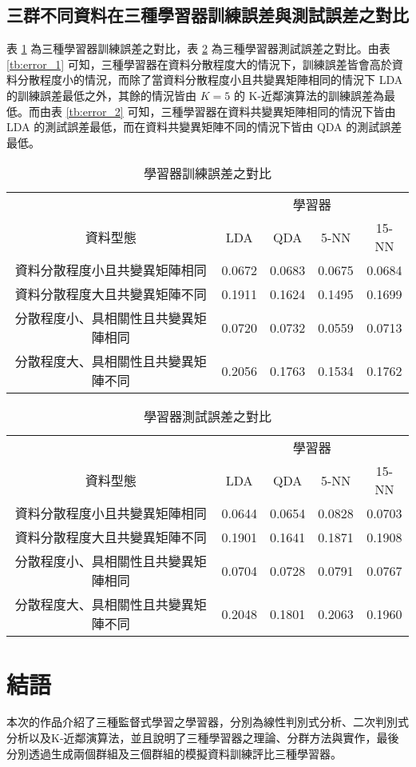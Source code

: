 \subsection{三群不同資料在三種學習器訓練誤差與測試誤差之對比}
表 \ref{tb:error_3} 為三種學習器訓練誤差之對比，表 \ref{tb:error_4} 為三種學習器測試誤差之對比。由表 \ref{tb:error_1} 可知，三種學習器在資料分散程度大的情況下，訓練誤差皆會高於資料分散程度小的情況，而除了當資料分散程度小且共變異矩陣相同的情況下 LDA 的訓練誤差最低之外，其餘的情況皆由 $K = 5$ 的 K-近鄰演算法的訓練誤差為最低。而由表 \ref{tb:error_2} 可知，三種學習器在資料共變異矩陣相同的情況下皆由 LDA 的測試誤差最低，而在資料共變異矩陣不同的情況下皆由 QDA 的測試誤差最低。
\bigskip
\begin{table}[H] 
\centering
\caption{學習器訓練誤差之對比}\label{tb:error_3}
\tabcolsep=12pt
\begin{tabular}{ccccc} 
\toprule
& \multicolumn{4}{c}{學習器}\\
\cmidrule(l){2-5}
資料型態 & LDA & QDA & 5-NN & 15-NN\\[3pt]
\midrule
資料分散程度小且共變異矩陣相同 & \cellcolor{red!25}0.0672 & 0.0683  & 0.0675 & 0.0684 \\[3pt]
資料分散程度大且共變異矩陣不同 & 0.1911 & 0.1624 & \cellcolor{red!25}0.1495 & 0.1699 \\[3pt]
分散程度小、具相關性且共變異矩陣相同 & 0.0720 &  0.0732 & \cellcolor{red!25}0.0559 & 0.0713 \\ [3pt]
分散程度大、具相關性且共變異矩陣不同 & 0.2056 &  0.1763 & \cellcolor{red!25}0.1534 & 0.1762 \\ 
\bottomrule
\end{tabular}
\end{table}\bigskip
\begin{table}[H] 
\centering
\caption{學習器測試誤差之對比}\label{tb:error_4}
\tabcolsep=12pt
\begin{tabular}{ccccc} 
\toprule
& \multicolumn{4}{c}{學習器}\\
\cmidrule(l){2-5}
資料型態 & LDA & QDA & 5-NN & 15-NN\\[3pt]
\midrule
資料分散程度小且共變異矩陣相同 & \cellcolor{red!25}0.0644 & 0.0654  & 0.0828 & 0.0703 \\[3pt]
資料分散程度大且共變異矩陣不同 & 0.1901 & \cellcolor{red!25}0.1641 & 0.1871 & 0.1908 \\[3pt]
分散程度小、具相關性且共變異矩陣相同 & \cellcolor{red!25}0.0704 & 0.0728 & 0.0791 & 0.0767 \\ [3pt]
分散程度大、具相關性且共變異矩陣不同 & 0.2048 &  \cellcolor{red!25}0.1801 & 0.2063 & 0.1960 \\
\bottomrule
\end{tabular}
\end{table} 
\section{結語}
本次的作品介紹了三種監督式學習之學習器，分別為線性判別式分析、二次判別式分析以及K-近鄰演算法，並且說明了三種學習器之理論、分群方法與實作，最後分別透過生成兩個群組及三個群組的模擬資料訓練評比三種學習器。
%